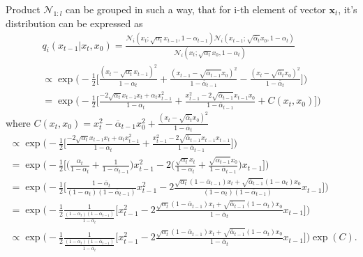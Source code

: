 \documentclass[10pt]{article}
\begin{document}
 Product   $ \mathcal{N}_{1:l}$ can be grouped in such a way, that for i-th element of vector $\textbf{x}_{t}$, it's distribution can be expressed as
\begin{gather}
q_{i}( x_{t-1}|  x_{t}, x_{0})   = 
\frac{
  \mathcal{N}_{i}(x_{t};\sqrt{\alpha_{t}} x_{t-1}, 1 - \alpha_{t-1}) 
  \mathcal{N}_{i}(x_{t-1};\sqrt{\overline{\alpha}_{t}} x_{0}, 1 - \alpha_{t}) 
  }{
    \mathcal{N}_{i}(x_{t};\sqrt{\alpha_{t}} x_{0}, 1 - \alpha_{t}) 
  } \\ 
\propto \exp \Big( -\frac{1}{2}\Big[ 
\frac{(x_t - \sqrt{ \alpha_{t}} x_{t-1})^{2} }{1 - \alpha_{t}} + 
\frac{(x_{t-1} - \sqrt{ \overline{\alpha}_{t-1}} x_{0})^{2} }{1 - \overline{\alpha}_{t-1}} -
\frac{(x_t - \sqrt{\overline{\alpha}_{t}} x_{0})^{2} }{1- \overline{\alpha}_{t}}
\Big]\Big) \\ 
= \exp \Big( -\frac{1}{2}\Big[ 
\frac{ -2\sqrt{ \alpha_{t}} x_{t-1} x_t + \alpha_{t}x_{t-1}^{2} }{1 - \alpha_{t}} + 
\frac{x_{t-1}^{2} - 2\sqrt{ \overline{\alpha}_{t-1}}x_{t-1}x_{0} }{1 - \overline{\alpha}_{t-1}}+
C(x_t, x_0)
\Big]\Big) 
\end{gather} 
where $C(x_t, x_0) = x_t^2 - \overline{\alpha}_{t-1}x_0^2 +
\frac{(x_t - \sqrt{\overline{\alpha}_{t}} x_{0})^{2} }{1- \overline{\alpha}_{t}}$
\begin{gather} 
\propto \exp \Big( -\frac{1}{2}\Big[ 
\frac{ -2\sqrt{ \alpha_{t}} x_{t-1} x_t + \alpha_{t}x_{t-1}^{2} }{1 - \alpha_{t}} + 
\frac{x_{t-1}^{2} - 2\sqrt{ \overline{\alpha}_{t-1}}x_{t-1}x_{t-1} }{1 - \overline{\alpha}_{t-1}}
\Big]\Big) \\
= \exp \Big( -\frac{1}{2}\Big[ 
\Big( \frac{\alpha_{t}}{1 - \alpha_{t}} + \frac{1}{1-\overline{\alpha}_{t-1}} \Big) x_{t-1}^2 -
2\Big( \frac{\sqrt{ \alpha_{t}} x_{t}}{1 - \alpha_{t}} +
\frac{\sqrt{ \overline{\alpha}_{t-1}} x_{0}}{1-\overline{\alpha}_{t-1}}   \Big) x_{t-1} 
\Big]\Big)  \\
= \exp \Big( -\frac{1}{2}\Big[ 
\frac{1 - \overline{\alpha}_t }{(1 - \alpha_{t})(1-\overline{\alpha}_{t-1})} x_{t-1}^2 -
2\frac{\sqrt{ \alpha_{t}}(1-\overline{\alpha}_{t-1}) x_{t} + 
\sqrt{ \overline{\alpha}_{t-1}}(1 - \alpha_{t}) x_{0} }
{(1 - \alpha_{t})(1-\overline{\alpha}_{t-1})} x_{t-1} 
\Big]\Big) \\
=  \exp \Big( -\frac{1}{2}
\frac{1}{\frac{(1 - \alpha_{t})(1-\overline{\alpha}_{t-1})}{1 - \overline{\alpha}_t }} \Big[ 
 x_{t-1}^2 -
2\frac{\sqrt{ \alpha_{t}}(1-\overline{\alpha}_{t-1}) x_{t} + 
\sqrt{ \overline{\alpha}_{t-1}}(1 - \alpha_{t}) x_{0} }
{1-\overline{\alpha}_{t}} x_{t-1} 
\Big]\Big) \\
\propto 
\exp \Big( -\frac{1}{2}
\frac{1}{\frac{(1 - \alpha_{t})(1-\overline{\alpha}_{t-1})}{1 - \overline{\alpha}_t }} \Big[ 
 x_{t-1}^2 -
2\frac{\sqrt{ \alpha_{t}}(1-\overline{\alpha}_{t-1}) x_{t} + 
\sqrt{ \overline{\alpha}_{t-1}}(1 - \alpha_{t}) x_{0} }
{1-\overline{\alpha}_{t}} x_{t-1} 
\Big]\Big) \exp(C).
\end{gather}
\end{document}
